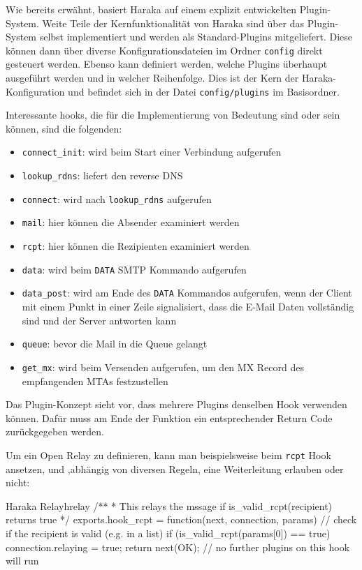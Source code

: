Wie bereits erwähnt, basiert Haraka auf einem explizit entwickelten Plugin-System. Weite Teile der Kernfunktionalität von Haraka sind über das Plugin-System selbst implementiert und werden als Standard-Plugins mitgeliefert. Diese können dann über diverse Konfigurationsdateien im Ordner \verb#config# direkt gesteuert werden. Ebenso kann definiert werden, welche Plugins überhaupt ausgeführt werden und in welcher Reihenfolge. Dies ist der Kern der Haraka-Konfiguration und befindet sich in der Datei \verb#config/plugins# im Basisordner.

Interessante hooks, die für die Implementierung von Bedeutung sind oder sein können, sind die folgenden:
\begin{itemize}
\item \verb#connect_init#: wird beim Start einer Verbindung aufgerufen
\item \verb|lookup_rdns|: liefert den reverse DNS
\item \verb#connect#: wird nach \verb|lookup_rdns| aufgerufen
\item \verb#mail#: hier können die Absender examiniert werden
\item \verb#rcpt#: hier können die Rezipienten examiniert werden
\item \verb#data#: wird beim \verb#DATA# SMTP Kommando aufgerufen
\item \verb#data_post#: wird am Ende des \verb#DATA# Kommandos aufgerufen, wenn der Client mit einem Punkt in einer Zeile signalisiert, dass die E-Mail Daten vollständig sind und der Server antworten kann
\item \verb#queue#: bevor die Mail in die Queue gelangt
\item \verb#get_mx#: wird beim Versenden aufgerufen, um den MX Record des empfangenden MTAs festzustellen
\end{itemize}

Das Plugin-Konzept sieht vor, dass mehrere Plugins denselben Hook verwenden können. Dafür muss am Ende der Funktion ein entsprechender Return Code zurückgegeben werden.

Um ein Open Relay zu definieren, kann man beispielsweise beim \verb#rcpt# Hook ansetzen, und ,abhängig von diversen Regeln, eine Weiterleitung erlauben oder nicht:
\begin{JavaScript}{Haraka Relay}{hrelay}
/**
 * This relays the mssage if is_valid_rcpt(recipient) returns true
 */
exports.hook_rcpt = function(next, connection, params) {
	// check if the recipient is valid (e.g. in a list)
	if (is_valid_rcpt(params[0]) == true) {
		connection.relaying = true;
	}
	return next(OK); // no further plugins on this hook will run
}
\end{JavaScript}

